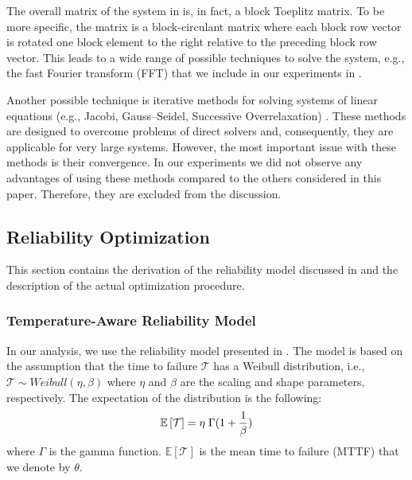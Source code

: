 The overall matrix of the system in  is, in fact, a block Toeplitz
matrix. To be more specific, the matrix is a block-circulant matrix where each
block row vector is rotated one block element to the right relative to the
preceding block row vector. This leads to a wide range of possible techniques to
solve the system, e.g., the fast Fourier transform (FFT) \cite{mazancourt1983}
that we include in our experiments in .

Another possible technique is iterative methods for solving systems of linear
equations (e.g., Jacobi, Gauss--Seidel, Successive Overrelaxation)
\cite{press2007}. These methods are designed to overcome problems of direct
solvers and, consequently, they are applicable for very large systems. However,
the most important issue with these methods is their convergence. In our
experiments we did not observe any advantages of using these methods compared to
the others considered in this paper. Therefore, they are excluded from the
discussion.

\subsection{Reliability Optimization}

This section contains the derivation of the reliability model discussed in
 and the description of the actual optimization
procedure.

\subsubsection{Temperature-Aware Reliability Model}

In our analysis, we use the reliability model presented in \cite{huang2009,
xiang2010}. The model is based on the assumption that the time to failure
$\mathcal{T}$ has a Weibull distribution, i.e., $\mathcal{T} \sim Weibull(\eta,
\beta)$ where $\eta$ and $\beta$ are the scaling and shape parameters,
respectively. The expectation of the distribution is the following:
\begin{equation} \elab{general-mttf}
  \mathbb{E}\left[\mathcal{T}\right] = \eta \; \Gamma(1 + \frac{1}{\beta})
\end{equation}
where $\Gamma$ is the gamma function. $\mathbb{E}\left[\mathcal{T}\right]$ is
the mean time to failure (MTTF) that we denote by $\theta$.

